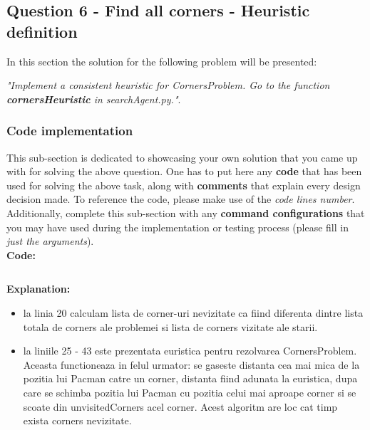 \subsection{Question 6 - Find all corners - Heuristic definition}
In this section the solution for the following problem will be presented: \newline


\textit{"Implement  a  consistent  heuristic  for  CornersProblem. Go to the function \textbf{cornersHeuristic} in searchAgent.py."}.


\subsubsection{Code implementation}
This sub-section is dedicated to showcasing your own solution that you came up with for solving the above question. One has to put here any \textbf{code} that has been used for solving the above task, along with \textbf{comments} that explain every design decision made. To reference the code, please make use of the \textit{code lines number}. Additionally, complete this sub-section with any \textbf{command configurations} that you may have used during the implementation or testing process (please fill in \textit{just the arguments}). \\

\textbf{Code:}

\inputminted[linenos]{python}{code/06_consistent_heuristic.py}


\textbf{Explanation:}
\begin{itemize}
    \setlength\itemsep{0em}
\item la linia 20 calculam lista de corner-uri nevizitate ca fiind diferenta dintre lista totala de corners ale problemei si lista de corners vizitate ale starii.
    \item la liniile 25 - 43 este prezentata euristica pentru rezolvarea CornersProblem. Aceasta functioneaza in felul urmator: se gaseste distanta cea mai mica de la pozitia lui Pacman catre un corner, distanta fiind adunata la euristica, dupa care se schimba pozitia lui Pacman cu pozitia celui mai aproape corner si se scoate din unvisitedCorners acel corner. Acest algoritm are loc cat timp exista corners nevizitate. %

\end{itemize}


